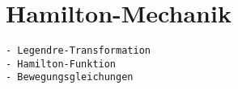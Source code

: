 %
%
%
\section{Hamilton-Mechanik
\label{buch:mechanik:section:legendre}}

\begin{verbatim}
- Legendre-Transformation
- Hamilton-Funktion
- Bewegungsgleichungen
\end{verbatim}
